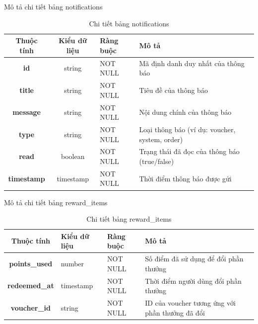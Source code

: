 \documentclass[../DoAn.tex]{subfiles}
\begin{document}
Mô tả chi tiết bảng notifications
\begin{table}[H]
\centering
\begin{tabular}{|c|c|l|p{7cm}|}
\hline
\textbf{Thuộc tính} & \textbf{Kiểu dữ liệu} & \textbf{Ràng buộc} & \textbf{Mô tả} \\ \hline
\textbf{id} & string & NOT NULL & Mã định danh duy nhất của thông báo \\ \hline
\textbf{title} & string & NOT NULL & Tiêu đề của thông báo \\ \hline
\textbf{message} & string & NOT NULL & Nội dung chính của thông báo \\ \hline
\textbf{type} & string & NOT NULL & Loại thông báo (ví dụ: voucher, system, order) \\ \hline
\textbf{read} & boolean & NOT NULL & Trạng thái đã đọc của thông báo (true/false) \\ \hline
\textbf{timestamp} & timestamp & NOT NULL & Thời điểm thông báo được gửi \\ \hline
\end{tabular}
\caption{Chi tiết bảng notifications}
\label{tab:notificationsTable}
\end{table}

Mô tả chi tiết bảng reward\_items
\begin{table}[H]
\centering
\begin{tabular}{|c|p{3.5cm}|l|p{6cm}|}
\hline
\textbf{Thuộc tính} & \textbf{Kiểu dữ liệu} & \textbf{Ràng buộc} & \textbf{Mô tả} \\ \hline
\textbf{points\_used} & number & NOT NULL & Số điểm đã sử dụng để đổi phần thưởng \\ \hline
\textbf{redeemed\_at} & timestamp & NOT NULL & Thời điểm người dùng đổi phần thưởng \\ \hline
\textbf{voucher\_id} & string & NOT NULL & ID của voucher tương ứng với phần thưởng đã đổi \\ \hline
\end{tabular}
\caption{Chi tiết bảng reward\_items}
\label{tab:rewardItemsTable}
\end{table}
\end{document}
